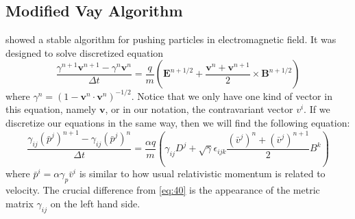 \subsection{Modified Vay Algorithm}
\label{sec:Vay-mod}

\citet{vay_simulation_2008}
showed a stable algorithm for pushing particles in electromagnetic
field. It was designed to solve discretized equation
\begin{equation}
  \label{eq:40}
  \frac{\gamma^{n+1}\mathbf{v}^{n+1} - \gamma^n\mathbf{v}^n}{\Delta t} = \frac{q}{m}\left( \mathbf{E}^{n+1/2} + \frac{\mathbf{v}^n + \mathbf{v}^{n+1}}{2}\times \mathbf{B}^{n+1/2} \right)
\end{equation}
where $\gamma^n = (1 - \mathbf{v}^n\cdot \mathbf{v}^n)^{-1/2}$. Notice that we
only have one kind of vector in this equation, namely $\mathbf{v}$, or in our
notation, the contravariant vector $v^i$. If we discretize our equations in the
same way, then we will find the following equation:
\begin{equation}
  \label{eq:41}
  \frac{\gamma_{ij}(\bar{p}^j)^{n+1} - \gamma_{ij}(\bar{p}^j)^n}{\Delta t} = \frac{\alpha q}{m}\left( \gamma_{ij}D^j + \sqrt{\gamma}\epsilon_{ijk}\frac{(\bar{v}^j)^n + (\bar{v}^j)^{n+1}}{2}B^k \right)
\end{equation}
where $\bar{p}^i = \alpha\gamma_p\bar{v}^i$ is similar to how usual relativistic
momentum is related to velocity. The crucial difference from \eqref{eq:40} is
the appearance of the metric matrix $\gamma_{ij}$ on the left hand side.

